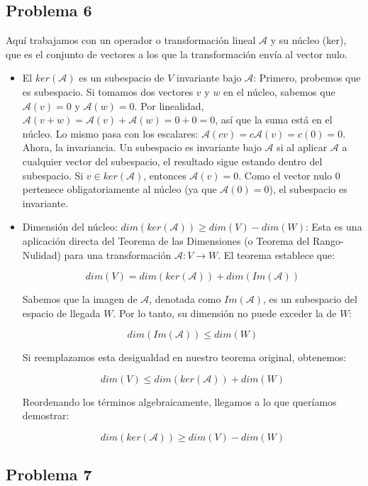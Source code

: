 \documentclass[11pt,spanish]{article}
\begin{document}
\subsection*{Problema 6}

Aquí trabajamos con un operador o transformación lineal $\mathcal{A}$ y su núcleo (ker), que es el conjunto de vectores a los que la transformación envía al vector nulo.

\begin{itemize}
\item El $ker(\mathcal{A})$ es un subespacio de $V$ invariante bajo $\mathcal{A}$:
Primero, probemos que es subespacio. Si tomamos dos vectores $v$ y $w$ en el núcleo, sabemos que $\mathcal{A}(v) = 0$ y $\mathcal{A}(w) = 0$. Por linealidad, $\mathcal{A}(v+w) = \mathcal{A}(v) + \mathcal{A}(w) = 0 + 0 = 0$, así que la suma está en el núcleo. Lo mismo pasa con los escalares: $\mathcal{A}(cv) = c\mathcal{A}(v) = c(0) = 0$.
Ahora, la invariancia. Un subespacio es invariante bajo $\mathcal{A}$ si al aplicar $\mathcal{A}$ a cualquier vector del subespacio, el resultado sigue estando dentro del subespacio. Si $v \in ker(\mathcal{A})$, entonces $\mathcal{A}(v) = 0$. Como el vector nulo $0$ pertenece obligatoriamente al núcleo (ya que $\mathcal{A}(0) = 0$), el subespacio es invariante.

\item Dimensión del núcleo: $dim(ker(\mathcal{A}))\ge dim(V)-dim(W)$:
Esta es una aplicación directa del Teorema de las Dimensiones (o Teorema del Rango-Nulidad) para una transformación $\mathcal{A}:V\rightarrow W$. El teorema establece que:

$$dim(V) = dim(ker(\mathcal{A})) + dim(Im(\mathcal{A}))$$

Sabemos que la imagen de $\mathcal{A}$, denotada como $Im(\mathcal{A})$, es un subespacio del espacio de llegada $W$. Por lo tanto, su dimensión no puede exceder la de $W$:

$$dim(Im(\mathcal{A})) \le dim(W)$$

Si reemplazamos esta desigualdad en nuestro teorema original, obtenemos:

$$dim(V) \le dim(ker(\mathcal{A})) + dim(W)$$

Reordenando los términos algebraicamente, llegamos a lo que queríamos demostrar:

$$dim(ker(\mathcal{A})) \ge dim(V) - dim(W)$$
\end{itemize}

\subsection*{Problema 7}
\end{document}
